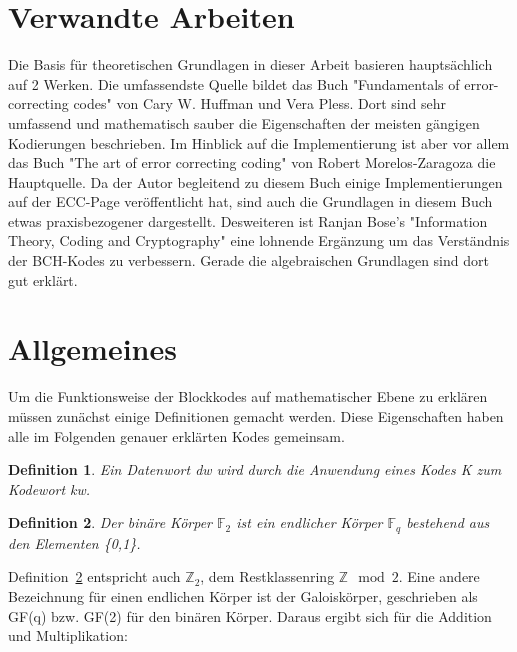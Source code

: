 
\section{Verwandte Arbeiten}
\label{chapter:related}

Die Basis für theoretischen Grundlagen in dieser Arbeit basieren hauptsächlich auf 2 Werken. Die umfassendste Quelle bildet das Buch "Fundamentals of error-correcting codes" von Cary W. Huffman und Vera Pless.\cite{huffman2010fundamentals} Dort sind sehr umfassend und mathematisch sauber die Eigenschaften der meisten gängigen Kodierungen beschrieben. Im Hinblick auf die Implementierung ist aber vor allem das Buch "The art of error correcting coding" von Robert Morelos-Zaragoza\cite{morelos2006art} die Hauptquelle. Da der Autor begleitend zu diesem Buch einige Implementierungen auf der ECC-Page\cite{eccpage} veröffentlicht hat, sind auch die Grundlagen in diesem Buch etwas praxisbezogener dargestellt. Desweiteren ist Ranjan Bose's "Information Theory, Coding and Cryptography"\cite{bose2008infotheory} eine lohnende Ergänzung um das Verständnis der BCH-Kodes zu verbessern. Gerade die algebraischen Grundlagen sind dort gut erklärt.

\section{Allgemeines}
\label{sec:general}
Um die Funktionsweise der Blockkodes auf mathematischer Ebene zu erklären müssen zunächst einige Definitionen gemacht werden. Diese Eigenschaften haben alle im Folgenden genauer erklärten Kodes gemeinsam.
\newtheorem{t_def}{Definition}[chapter]

\begin{t_def}
Ein {\em Datenwort dw} wird durch die Anwendung eines {\em Kodes K} zum {\em Kodewort kw}.
\end{t_def}

\begin{t_def}
\label{def:f2}
Der binäre Körper $\mathbb{F}_{2}$ ist ein endlicher Körper $\mathbb{F}_{q}$ bestehend aus den Elementen \{0,1\}.
\end{t_def}

Definition~\ref{def:f2} entspricht auch $\mathbb{Z}_2$, dem Restklassenring $\mathbb{Z}\mod 2$. Eine andere Bezeichnung für einen endlichen Körper ist der Galoiskörper, geschrieben als GF(q) bzw. GF(2) für den binären Körper. Daraus ergibt sich für die Addition und Multiplikation:\newline

